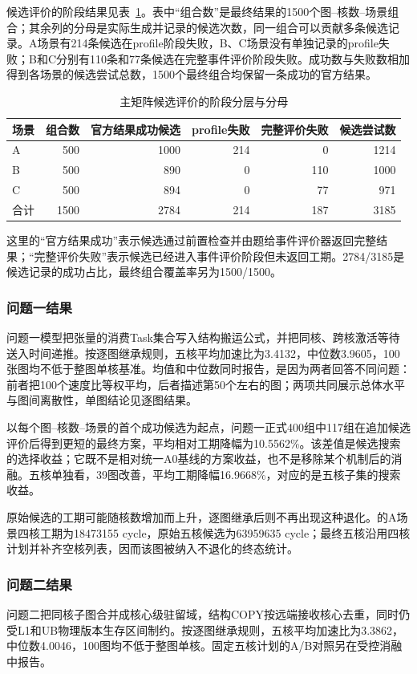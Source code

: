 候选评价的阶段结果见表~\ref{tab:candidate-status}。表中“组合数”是最终结果的1500个图--核数--场景组合；其余列的分母是实际生成并记录的候选次数，同一组合可以贡献多条候选记录。A场景有214条候选在profile阶段失败，B、C场景没有单独记录的profile失败；B和C分别有110条和77条候选在完整事件评价阶段失败。成功数与失败数相加得到各场景的候选尝试总数，1500个最终组合均保留一条成功的官方结果。
\begin{table}[H]\centering\small
\caption{主矩阵候选评价的阶段分层与分母}\label{tab:candidate-status}
\setlength{\tabcolsep}{4pt}
\begin{tabular}{lrrrrr}\toprule
场景 & 组合数 & 官方结果成功候选 & profile失败 & 完整评价失败 & 候选尝试数\\\midrule
A & 500 & 1000 & 214 & 0 & 1214\\
B & 500 & 890 & 0 & 110 & 1000\\
C & 500 & 894 & 0 & 77 & 971\\\midrule
合计 & 1500 & 2784 & 214 & 187 & 3185\\\bottomrule
\end{tabular}
\end{table}
这里的“官方结果成功”表示候选通过前置检查并由题给事件评价器返回完整结果；“完整评价失败”表示候选已经进入事件评价阶段但未返回工期。2784/3185是候选记录的成功占比，最终组合覆盖率另为1500/1500。

\subsubsection{问题一结果}
问题一模型把张量的消费Task集合写入结构搬运公式，并把同核、跨核激活等待送入时间递推。按逐图继承规则，五核平均加速比为3.4132，中位数3.9605，100张图均不低于整图单核基准。均值和中位数同时报告，是因为两者回答不同问题：前者把100个速度比等权平均，后者描述第50个左右的图；两项共同展示总体水平与图间离散性，单图结论见逐图结果。

以每个图--核数--场景的首个成功候选为起点，问题一正式400组中117组在追加候选评价后得到更短的最终方案，平均相对工期降幅为10.5562\%。该差值是候选搜索的选择收益；它既不是相对统一A0基线的方案收益，也不是移除某个机制后的消融。五核单独看，39图改善，平均工期降幅16.9668\%，对应的是五核子集的搜索收益。

原始候选的工期可能随核数增加而上升，逐图继承后则不再出现这种退化。的A场景四核工期为18473155 cycle，原始五核候选为63959635 cycle；最终五核沿用四核计划并补齐空核列表，因而该图被纳入不退化的终态统计。

\subsubsection{问题二结果}
问题二把同核子图合并成核心级驻留域，结构COPY按远端接收核心去重，同时仍受L1和UB物理版本生存区间制约。按逐图继承规则，五核平均加速比为3.3862，中位数4.0046，100图均不低于整图单核。固定五核计划的A/B对照另在受控消融中报告。


